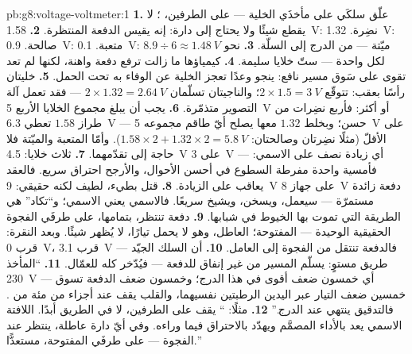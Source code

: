\begin{solution}{pb:g8:voltage-voltmeter:1}
\textbf{1.} علّق سلكَي  على مأخذَي الخلية --- على
الطرفين، ؛  لا يقطع شيئًا ولا يحتاج
إلى دارة: إنه يقيس الدفعة المنتظرة.
\textbf{2.} \qty{1.58}{V}: نضِرة. \qty{1.32}{V}: صالحة.
\qty{0.9}{V}: متعبة. \qty{0.1}{V}: ميّتة --- من الدرج إلى
السلّة.
\textbf{3.} نحو $8.9 \div 6 \approx \qty{1.48}{V}$ لكل واحدة
--- ستّ خلايا سليمة.
\textbf{4.} كيمياؤها ما زالت ترفع دفعة واهنة، لكنها لم تعد
تقوى على سَوق مسير نافع:  ينجو وعدًا تعجز الخلية عن
الوفاء به تحت الحمل.
\textbf{5.} خليتان رأسًا بعقب: تتوقّع $2 \times 1.5 =
\qty{3}{V}$؛ والناجيتان تسلّمان $2 \times 1.32 =
\qty{2.64}{V}$ --- فقد تعمل آلة التصوير متذمّرة.
\textbf{6.} يجب أن يبلغ مجموع الخلايا الأربع \qty{5}{V} أو
أكثر: فأربع نضِرات من طراز $1.58$ تعطي \qty{6.3}{V} ---
حسن؛ وبخلط $1.32$ معها يصلح أيّ طاقم مجموعه \qty{5}{V} على
الأقلّ (مثلًا نضِرتان وصالحتان: $1.58 \times 2 + 1.32 \times 2
= \qty{5.8}{V}$). وأمّا المتعبة والميّتة فلا حاجة إلى
تقدّمهما.
\textbf{7.} ثلاث خلايا: \qty{4.5}{V} على  \qty{3}{V} ---
أي زيادة نصف على الاسمي: فأمسية واحدة مفرطة السطوع في أحسن
الأحوال، والأرجح احتراق سريع. فالعقد يعاقب على الزيادة.
\textbf{8.} قتل بطيء، لطيف لكنه حقيقي:  \qty{9}{V} على
جهاز \qty{8}{V} دفعة زائدة مستمرّة --- سيعمل، ويسخن، ويشيخ سريعًا.
فالاسمي يعني الاسمي؛ و``تكاد'' هي الطريقة التي تموت بها
الخيوط في شبابها.
\textbf{9.} دفعة  تنتظر، بتمامها، على طرفَي الفجوة
الحقيقية الوحيدة ---  المفتوحة؛  العاطل، وهو لا
يحمل تيارًا، لا يُظهر شيئًا. وبعد النقرة:  قرب
\qty{0}{V}،  قرب \qty{3.1}{V} --- فالدفعة تنتقل من
الفجوة إلى العامل.
\textbf{10.} أن السلك الجيّد طريق مستوٍ: يسلّم المسير من غير
إنفاق للدفعة --- فيُدّخر  كله للعمّال.
\textbf{11.} ``المأخذ \qty{230}{V} --- أي خمسون ضعف أقوى
 في هذا الدرج؛ وخمسون ضعف الدفعة تسوق خمسين ضعف التيار
عبر اليدين الرطبتين نفسيهما، والقلب يقف عند أجزاء من مئة من
. فالتدقيق ينتهي عند الدرج.''
\textbf{12.} مثلًا: `` يقف على الطرفين، لا في
الطريق أبدًا.  اللافتة الاسمي يعد بالأداء المصمَّم
ويهدّد بالاحتراق فيما وراءه. وفي أيّ دارة عاطلة، ينتظر 
عند الفجوة --- على طرفَي  المفتوحة، مستعدًّا.''
\end{solution}
